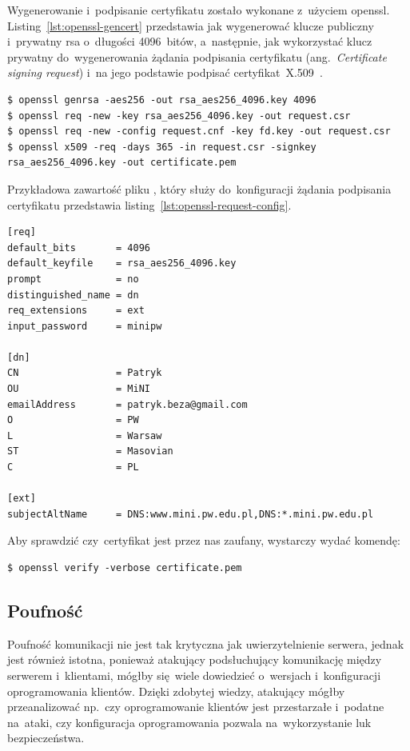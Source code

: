 \documentclass[thesis]{subfiles}
\begin{document}
Wygenerowanie i~podpisanie certyfikatu zostało wykonane z~użyciem \gls{openssl}. Listing~\ref{lst:openssl-gencert} przedstawia jak wygenerować klucze publiczny i~prywatny \gls{rsa} o~długości 4096~bitów, a~następnie, jak wykorzystać klucz prywatny do~wygenerowania żądania podpisania certyfikatu (ang.~\emph{Certificate signing request}) i~na jego podstawie podpisać certyfikat~X.509~\cite{openssl-cookbook,wiki:csr}.

\begin{lstlisting}[numbers=none,caption={Wygenerowanie i~podpisanie certyfikatu X.509},label=lst:openssl-gencert]
$ openssl genrsa -aes256 -out rsa_aes256_4096.key 4096
$ openssl req -new -key rsa_aes256_4096.key -out request.csr
$ openssl req -new -config request.cnf -key fd.key -out request.csr
$ openssl x509 -req -days 365 -in request.csr -signkey rsa_aes256_4096.key -out certificate.pem
\end{lstlisting}

Przykładowa zawartość pliku , który służy do~konfiguracji żądania podpisania certyfikatu przedstawia listing~\ref{lst:openssl-request-config}.

\begin{lstlisting}[numbers=none,caption={Plik z~konfiguracją certyfikatu X.509},label=lst:openssl-request-config]
[req]
default_bits       = 4096
default_keyfile    = rsa_aes256_4096.key
prompt             = no
distinguished_name = dn
req_extensions     = ext
input_password     = minipw

[dn]
CN                 = Patryk
OU                 = MiNI
emailAddress       = patryk.beza@gmail.com
O                  = PW
L                  = Warsaw
ST                 = Masovian
C                  = PL

[ext]
subjectAltName     = DNS:www.mini.pw.edu.pl,DNS:*.mini.pw.edu.pl
\end{lstlisting}

Aby sprawdzić czy~certyfikat jest przez nas zaufany, wystarczy wydać komendę:
\begin{lstlisting}[numbers=none]
$ openssl verify -verbose certificate.pem
\end{lstlisting}


\subsection{Poufność}

Poufność komunikacji nie jest tak krytyczna jak uwierzytelnienie serwera, jednak jest również istotna, ponieważ atakujący podsłuchujący komunikację między serwerem i~klientami, mógłby się~wiele dowiedzieć o~wersjach i~konfiguracji oprogramowania klientów. Dzięki zdobytej wiedzy, atakujący mógłby przeanalizować np.~czy oprogramowanie klientów jest przestarzałe i~podatne na~ataki, czy konfiguracja oprogramowania pozwala na~wykorzystanie luk bezpieczeństwa.
\end{document}
